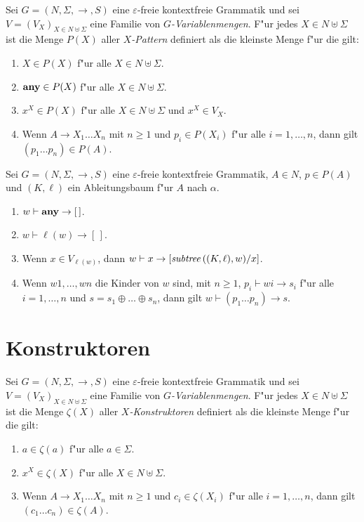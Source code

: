 \documentclass[12pt,a4paper]{article}
\begin{document}
\begin{definition}[Patterns]
  Sei $G = (N,\Sigma,\to,S)$ eine $\varepsilon$-freie kontextfreie Grammatik und sei
  $V = (V_X)_{X\in N \uplus \Sigma}$ eine Familie von \emph{$G$-Variablenmengen}. F"ur
  jedes $X \in N \uplus \Sigma$ ist die Menge $P(X)$ aller \emph{$X$-Pattern}
  definiert als die kleinste Menge f"ur die gilt:
  \begin{enumerate}
  \item $X \in P(X)$ f"ur alle $X \in N \uplus \Sigma$.
  \item $\mathbf{any} \in P(X)$ f"ur alle $X \in N \uplus \Sigma$.
  \item $x^X \in P(X)$ f"ur alle $X \in N \uplus \Sigma$ und $x^X \in V_X$.
  \item Wenn $A \to X_1 \ldots X_n$ mit $n \ge 1$ und $p_i \in P(X_i)$ f"ur alle $i=1,\ldots,n$,
    dann gilt $(p_1 \ldots p_n) \in P(A)$.
  \end{enumerate}
\end{definition}

\begin{definition}[Patternmatching]
  Sei $G = (N,\Sigma,\to,S)$ eine $\varepsilon$-freie kontextfreie Grammatik,
  $A \in N$, $p \in P(A)$ und $(K,\ell)$ ein Ableitungsbaum f"ur $A$ nach $\alpha$. 
  \begin{enumerate}
  \item $w \vdash \mathbf{any} \to [\,]$.
  \item $w \vdash \ell(w) \to [\,]$.
  \item Wenn $x \in V_{\ell(w)}$, dann $w \vdash x \to [\mathit{subtree}\,((K,\ell),w)/x]$.
  \item Wenn $w1,\ldots,wn$ die Kinder von $w$ sind, mit $n \ge 1$, $p_i \vdash wi \to s_i$ f"ur alle
    $i=1,\ldots,n$ und $s = s_1 \oplus \ldots \oplus s_n$, dann gilt $w \vdash (p_1 \ldots p_n) \to s$.
  \end{enumerate}
\end{definition}


\section{Konstruktoren}

\begin{definition}[Konstruktoren]
  Sei $G = (N,\Sigma,\to,S)$ eine $\varepsilon$-freie kontextfreie Grammatik und sei
  $V = (V_X)_{X \in N \uplus \Sigma}$ eine Familie von \emph{$G$-Variablenmengen}. F"ur
  jedes $X \in N \uplus \Sigma$ ist die Menge $\zeta(X)$ aller \emph{$X$-Konstruktoren}
  definiert als die kleinste Menge f"ur die gilt:
  \begin{enumerate}
  \item $a \in \zeta(a)$ f"ur alle $a \in \Sigma$.
  \item $x^X \in \zeta(X)$ f"ur alle $X \in N \uplus \Sigma$.
  \item Wenn $A \to X_1 \ldots X_n$ mit $n \ge 1$ und $c_i \in \zeta(X_i)$ f"ur alle
    $i=1,\ldots,n$, dann gilt $(c_1 \ldots c_n) \in \zeta(A)$.
  \end{enumerate}
\end{definition}
\end{document}
